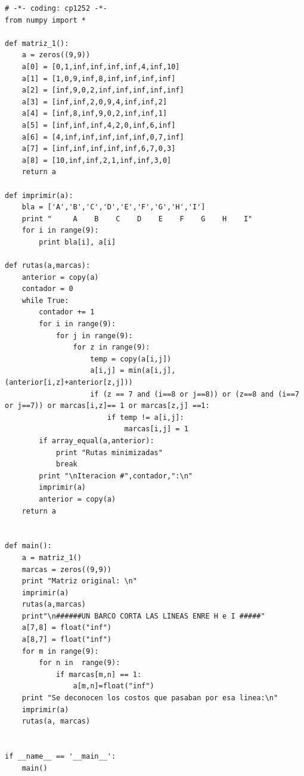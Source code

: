 \documentclass{article}
\begin{document}
\begin{lstlisting}
# -*- coding: cp1252 -*-
from numpy import *

def matriz_1():
    a = zeros((9,9))
    a[0] = [0,1,inf,inf,inf,inf,4,inf,10]
    a[1] = [1,0,9,inf,8,inf,inf,inf,inf]
    a[2] = [inf,9,0,2,inf,inf,inf,inf,inf]
    a[3] = [inf,inf,2,0,9,4,inf,inf,2]
    a[4] = [inf,8,inf,9,0,2,inf,inf,1]
    a[5] = [inf,inf,inf,4,2,0,inf,6,inf]
    a[6] = [4,inf,inf,inf,inf,inf,0,7,inf]
    a[7] = [inf,inf,inf,inf,inf,6,7,0,3]
    a[8] = [10,inf,inf,2,1,inf,inf,3,0]
    return a

def imprimir(a):
    bla = ['A','B','C','D','E','F','G','H','I']
    print "     A    B    C    D    E    F    G    H    I"
    for i in range(9):
        print bla[i], a[i]

def rutas(a,marcas):
    anterior = copy(a)
    contador = 0
    while True:
        contador += 1
        for i in range(9):
            for j in range(9):
                for z in range(9):
                    temp = copy(a[i,j])
                    a[i,j] = min(a[i,j], (anterior[i,z]+anterior[z,j]))
                    if (z == 7 and (i==8 or j==8)) or (z==8 and (i==7 or j==7)) or marcas[i,z]== 1 or marcas[z,j] ==1:
                        if temp != a[i,j]:
                            marcas[i,j] = 1
        if array_equal(a,anterior):
            print "Rutas minimizadas"
            break
        print "\nIteracion #",contador,":\n"
        imprimir(a)
        anterior = copy(a)
    return a

        
def main():
    a = matriz_1()
    marcas = zeros((9,9))
    print "Matriz original: \n"
    imprimir(a)
    rutas(a,marcas)
    print"\n######UN BARCO CORTA LAS LINEAS ENRE H e I #####"
    a[7,8] = float("inf")
    a[8,7] = float("inf")
    for m in range(9):
        for n in  range(9):
            if marcas[m,n] == 1:
                a[m,n]=float("inf")
    print "Se deconocen los costos que pasaban por esa linea:\n"
    imprimir(a)
    rutas(a, marcas)
    

if __name__ == '__main__':
    main()

\end{lstlisting}

\newpage
\end{document}
